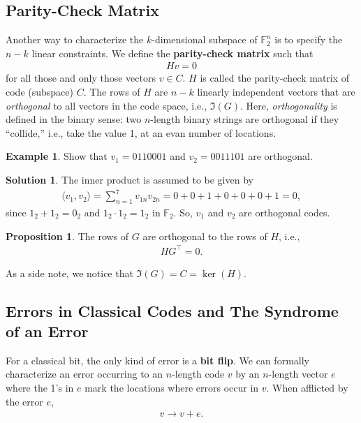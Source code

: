 \documentclass{article}
\theoremstyle{definition}
\newtheorem{exmp}{Example}[section]
\newtheorem{sln}{Solution}[section]
\newtheorem{prop}{Proposition}[section]
\begin{document}
\subsection{Parity-Check Matrix}
Another way to characterize the $k$-dimensional subspace of $\mathbb{F}^n_2$ is to specify the $n-k$ linear constraints. We define the \textbf{parity-check matrix} such that
\begin{align}
Hv = 0
\end{align}
for all those and only those vectors $v \in C$. $H$ is called the parity-check matrix of code (subspace) $C$. The rows of $H$ are $n-k$ linearly independent vectors that are \textit{orthogonal} to all vectors in the code space, i.e., $\Im(G)$. Here, \textit{orthogonality} is defined in the binary sense: two $n$-length binary strings are orthogonal if they ``collide,'' i.e., take the value 1, at an evan number of locations.

\begin{exmp}
	Show that $v_1 = 0110001$ and $v_2 = 0011101$ are orthogonal. \\
	
	\begin{sln}
		The inner product is assumed to be given by
		\begin{align}
		\langle v_1 , v_2 \rangle = \sum^7_{n=1}v_{1n}v_{2n} = 0 + 0 + 1 + 0 + 0 + 0 + 1 = 0,
		\end{align}
		since $1_2+1_2 = 0_2$ and $1_2\cdot 1_2 = 1_2$ in $\mathbb{F}_2$. So, $v_1$ and $v_2$ are orthogonal codes. \\
	\end{sln}
\end{exmp}





\begin{prop}
	The rows of $G$ are orthogonal to the rows of $H$, i.e., 
	\begin{align}
	HG^\top = 0.
	\end{align}
\end{prop}

As a side note, we notice that $\Im(G) = C = \ker(H)$.


\subsection{Errors in Classical Codes and The Syndrome of an Error}

For a classical bit, the only kind of error is a \textbf{bit flip}. We can formally characterize an error occurring to an $n$-length code $v$ by an $n$-length vector $e$ where the 1's in $e$ mark the locations where errors occur in $v$. When afflicted by the error $e$,
\begin{align}
v \to v+ e.
\end{align}
\end{document}
